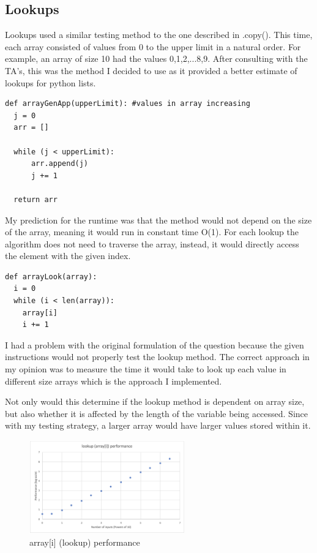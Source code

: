 \documentclass[12pt]{article}
\begin{document}
\subsection{Lookups}

Lookups used a similar testing method to the one described in .copy(). This time, each array consisted of values from 0 to the upper limit in a natural order. For example, an array of size 10 had the values 0,1,2,...8,9. After consulting with the TA's, this was the method I decided to use as it provided a better estimate of lookups for python lists.

\footnotesize
\begin{verbatim}
def arrayGenApp(upperLimit): #values in array increasing
  j = 0
  arr = []
  
  while (j < upperLimit):
      arr.append(j)
      j += 1

  return arr
\end{verbatim}
\normalsize

My prediction for the runtime was that the method would not depend on the size of the array, meaning it would run in constant time O(1). For each lookup the algorithm does not need to traverse the array, instead, it would directly access the element with the given index.

\footnotesize
\begin{verbatim}
def arrayLook(array):
  i = 0
  while (i < len(array)): 
    array[i]
    i += 1
\end{verbatim}
\normalsize

I had a problem with the original formulation of the question because the given instructions would not properly test the lookup method. The correct approach in my opinion was to measure the time it would take to look up each value in different size arrays which is the approach I implemented. 

Not only would this determine if the lookup method is dependent on array size, but also whether it is affected by the length of the variable being accessed. Since with my testing strategy, a larger array would have larger values stored within it.

\begin{figure}[H]
\centering
\includegraphics[width=0.6\textwidth,height=\textheight,keepaspectratio]{lookupgraph.png}
\caption{array[i] (lookup) performance}
\label{Figure: lookupgraph}
\end{figure}
\end{document}
